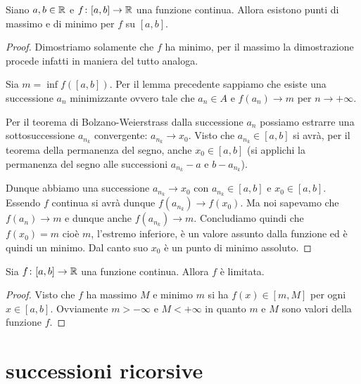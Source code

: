 \begin{theorem}[Weierstrass]%
\mymark{***}%
%
%
%
Siano $a,b\in {\mathbb R}$ e $f\colon [a,b]\to {\mathbb R}$ una funzione continua.
%
Allora esistono punti di massimo e di minimo per $f$ su $[a,b]$.
\end{theorem}
%
\begin{proof}
\mymark{***}%
Dimostriamo solamente che $f$ ha minimo, per il massimo la dimostrazione procede
infatti in maniera del tutto analoga.

Sia $m= \inf f([a,b])$.
Per il lemma precedente sappiamo che esiste una successione $a_n$ minimizzante ovvero tale che
$a_n \in A$ e $f(a_n)\to m$ per $n\to +\infty$.

Per il teorema di Bolzano-Weierstrass dalla successione $a_n$ possiamo estrarre una sottosuccessione 
$a_{n_k}$ convergente: $a_{n_k} \to x_0$.
Visto che $a_{n_k} \in [a,b]$ si avrà, per il teorema della permanenza del segno, anche 
$x_0 \in [a,b]$ (si applichi la permanenza del segno alle successioni $a_{n_k}-a$ e $b-a_{n_k}$).

Dunque abbiamo una successione $a_{n_k}\to x_0$ con $a_{n_k}\in [a,b]$ e
$x_0 \in [a,b]$. Essendo $f$ continua si avrà dunque $f(a_{n_k}) \to f(x_0)$.
Ma noi sapevamo che $f(a_n)\to m$ e dunque anche $f(a_{n_k}) \to m$.
Concludiamo quindi che $f(x_0) = m$ cioè $m$, l'estremo inferiore,
è un valore assunto dalla funzione ed è quindi un minimo.
Dal canto suo $x_0$ è un punto di minimo assoluto.
\end{proof}

\begin{corollary}
Sia $f\colon [a,b]\to {\mathbb R}$ una funzione continua. Allora $f$ è limitata.
\end{corollary}
\begin{proof}
Visto che $f$ ha massimo $M$ e minimo $m$ si ha $f(x)\in [m,M]$ per ogni $x\in[a,b]$.
Ovviamente $m>-\infty$ e $M<+\infty$ in quanto $m$ e $M$ sono valori della funzione $f$.
\end{proof}


\section{successioni ricorsive}


